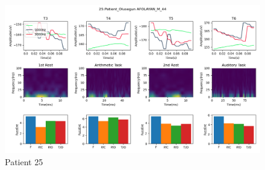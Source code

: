 \documentclass[conference]{IEEEconf}
\begin{document}
\clearpage
\begin{figure}
  \includegraphics[width=\textwidth]{../../data_analysis_results/results/Patient/25.png}
  \caption{Patient 25}
  \label{fig:patient_25}
\end{figure}
\end{document}
